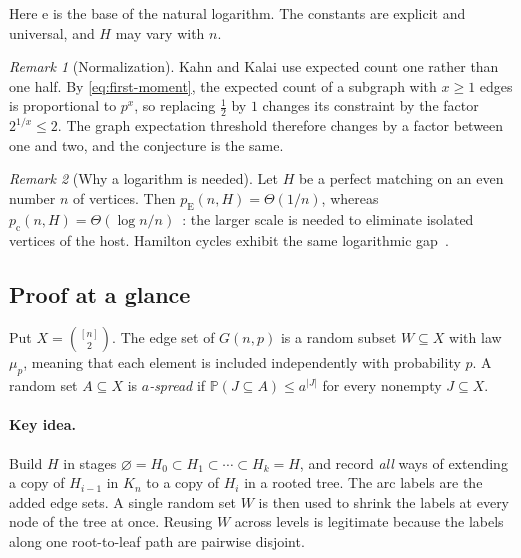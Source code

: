 \documentclass[11pt]{article}
\numberwithin{equation}{section}
\theoremstyle{remark}
\newtheorem*{remark}{Remark}
\newcommand{\PP}{\mathbb P}
\newcommand{\pc}{p_{\mathrm c}}
\newcommand{\pE}{p_{\mathrm E}}
\newcommand{\ee}{\mathrm e}
\begin{document}
Here $\ee$ is the base of the natural logarithm. The constants are
explicit and universal, and $H$ may vary with $n$.

\begin{remark}[Normalization]
Kahn and Kalai use expected count one rather than one half. By
\eqref{eq:first-moment}, the expected count of a subgraph with $x\ge1$
edges is proportional to $p^x$, so replacing $\frac12$ by $1$ changes
its constraint by the factor $2^{1/x}\le2$. The graph expectation
threshold therefore changes by a factor between one and two, and the
conjecture is the same.
\end{remark}

\begin{remark}[Why a logarithm is needed]
Let $H$ be a perfect matching on an even number $n$ of vertices. Then
$\pE(n,H)=\Theta(1/n)$, whereas
$\pc(n,H)=\Theta(\log n/n)$~\cite{ER66,KK07}: the larger scale is needed
to eliminate isolated vertices of the host. Hamilton cycles exhibit the
same logarithmic gap~\cite{KK07}.
\end{remark}

\subsection{Proof at a glance}\label{sec:glance}

Put $X=\binom{[n]}2$. The edge set of $G(n,p)$ is a random subset
$W\subseteq X$ with law $\mu_p$, meaning that each element is included
independently with probability $p$. A random set $A\subseteq X$ is
\emph{$a$-spread} if $\PP(J\subseteq A)\le a^{|J|}$ for every nonempty
$J\subseteq X$.

\paragraph{Key idea.}
Build $H$ in stages $\varnothing=H_0\subset H_1\subset\cdots\subset H_k=H$,
and record \emph{all} ways of extending a copy of $H_{i-1}$ in $K_n$ to
a copy of $H_i$ in a rooted tree. The arc labels are the added edge
sets. A single random set $W$ is then used to shrink the labels at every
node of the tree at once. Reusing $W$ across levels is legitimate
because the labels along one root-to-leaf path are pairwise disjoint.
\end{document}
